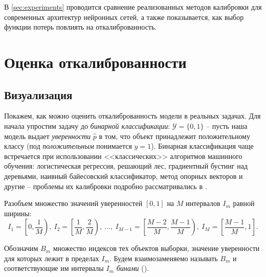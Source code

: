 \documentclass[12pt]{article}
\begin{document}
В \autoref{sec:experiments} проводится сравнение реализованных методов калибровки для современных архитектур нейронных сетей, а также показывается, как выбор функции потерь повлиять на откалиброванность.


\section{Оценка откалиброванности}\label{sec:estimate}
\subsection{Визуализация}
Покажем, как можно оценить откалиброванность модели в реальных задачах. Для начала упростим задачу до \emph{бинарной классификации}: $\mathcal{Y}=\{0,1\}$ -- пусть наша модель выдает \emph{уверенности} $\hat{p}$ в том, что объект принадлежит положительному классу (под \emph{положительным} понимается $y=1$). Бинарная классификация чаще встречается при использовании <<классических>> алгоритмов машинного обучения: логистическая регрессия, решающий лес, градиентный бустинг над деревьями, наивный байесовский классификатор, метод опорных векторов и другие -- проблемы их калибровки подробно рассматривались в \cite{good_proba, emp_comparison}.


Разобъем множество значений уверенностей $[0, 1]$ на $M$ интервалов $I_m$ равной ширины:
\begin{equation}\label{eq:binning}
I_1= \left[0, \frac{1}{M}\right),\
I_2= \left[\frac{1}{M},\frac{2}{M}\right),\
\dots,\
I_{M-1}= \left[\frac{M-2}{M},\frac{M-1}{M}\right),\
I_{M} = \left[\frac{M-1}{M}, 1\right].
\end{equation}

Обозначим $B_m$ множество индексов тех объектов выборки, значение уверенности для которых лежит в пределах $I_m$. Будем взаимозаменяемо называть $B_m$ и соответствующие им интервалы $I_m$ \emph{бинами} ().
\end{document}
